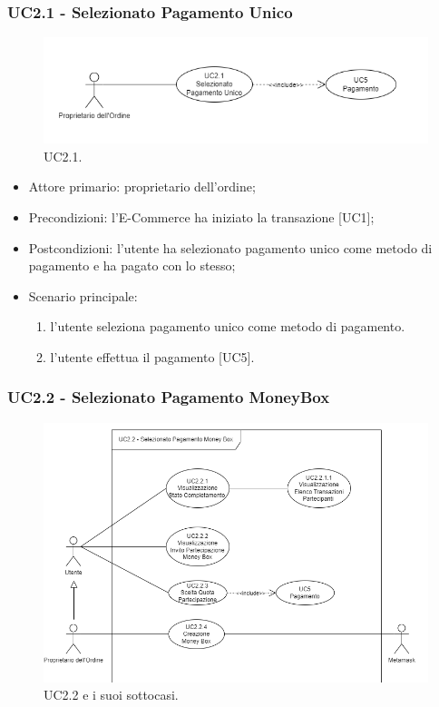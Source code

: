     \subsubsection{UC2.1 - Selezionato Pagamento Unico}\label{sssec: UC2.1}

    \begin{figure}[H]
    \centering
    \includegraphics[scale=0.7]{immagini/UseCases-UC2-2.png}
    \caption{UC2.1.}
    \end{figure}

    \begin{itemize}
    \item Attore primario: proprietario dell'ordine;
    \item Precondizioni: l'E-Commerce ha iniziato la transazione [UC1];
    \item Postcondizioni: l'utente ha selezionato pagamento unico come metodo di pagamento e ha pagato con lo stesso;
    \item Scenario principale:
    \begin{enumerate}
        \item l'utente seleziona pagamento unico come metodo di pagamento.
        \item l'utente effettua il pagamento [UC5].
    \end{enumerate}
    \end{itemize}

    \subsubsection{UC2.2 -  Selezionato Pagamento MoneyBox}

    \begin{figure}[H]
    \centering
    \includegraphics[scale=0.7]{immagini/UseCases-UC2-3.png}
    \caption{UC2.2 e i suoi sottocasi.}
    \end{figure}

